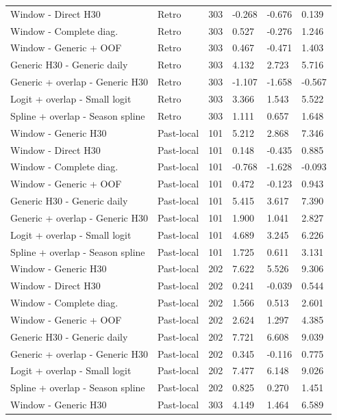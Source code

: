 {\begin{longtable}{p{}p{}p{}p{}p{}p{}}
Window - Direct H30 & Retro & 303 & -0.268 & -0.676 & 0.139 \\
Window - Complete diag. & Retro & 303 & 0.527 & -0.276 & 1.246 \\
Window - Generic + OOF & Retro & 303 & 0.467 & -0.471 & 1.403 \\
Generic H30 - Generic daily & Retro & 303 & 4.132 & 2.723 & 5.716 \\
Generic + overlap - Generic H30 & Retro & 303 & -1.107 & -1.658 & -0.567 \\
Logit + overlap - Small logit & Retro & 303 & 3.366 & 1.543 & 5.522 \\
Spline + overlap - Season spline & Retro & 303 & 1.111 & 0.657 & 1.648 \\
Window - Generic H30 & Past-local & 101 & 5.212 & 2.868 & 7.346 \\
Window - Direct H30 & Past-local & 101 & 0.148 & -0.435 & 0.885 \\
Window - Complete diag. & Past-local & 101 & -0.768 & -1.628 & -0.093 \\
Window - Generic + OOF & Past-local & 101 & 0.472 & -0.123 & 0.943 \\
Generic H30 - Generic daily & Past-local & 101 & 5.415 & 3.617 & 7.390 \\
Generic + overlap - Generic H30 & Past-local & 101 & 1.900 & 1.041 & 2.827 \\
Logit + overlap - Small logit & Past-local & 101 & 4.689 & 3.245 & 6.226 \\
Spline + overlap - Season spline & Past-local & 101 & 1.725 & 0.611 & 3.131 \\
Window - Generic H30 & Past-local & 202 & 7.622 & 5.526 & 9.306 \\
Window - Direct H30 & Past-local & 202 & 0.241 & -0.039 & 0.544 \\
Window - Complete diag. & Past-local & 202 & 1.566 & 0.513 & 2.601 \\
Window - Generic + OOF & Past-local & 202 & 2.624 & 1.297 & 4.385 \\
Generic H30 - Generic daily & Past-local & 202 & 7.721 & 6.608 & 9.039 \\
Generic + overlap - Generic H30 & Past-local & 202 & 0.345 & -0.116 & 0.775 \\
Logit + overlap - Small logit & Past-local & 202 & 7.477 & 6.148 & 9.026 \\
Spline + overlap - Season spline & Past-local & 202 & 0.825 & 0.270 & 1.451 \\
Window - Generic H30 & Past-local & 303 & 4.149 & 1.464 & 6.589 \\

\end{longtable}}
